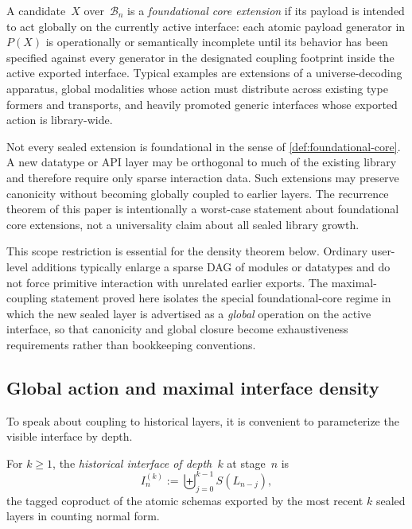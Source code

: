 \documentclass{lmcs}
\newcommand{\B}{\mathcal{B}}
\begin{document}
\begin{defi}
\label{def:foundational-core}
A candidate~$X$ over~$\B_n$ is a \emph{foundational core extension} if its payload is intended to act globally on the currently active interface: each atomic payload generator in $P(X)$ is operationally or semantically incomplete until its behavior has been specified against every generator in the designated coupling footprint inside the active exported interface. Typical examples are extensions of a universe-decoding apparatus, global modalities whose action must distribute across existing type formers and transports, and heavily promoted generic interfaces whose exported action is library-wide.
\end{defi}

\begin{rem}
\label{rem:orthogonal}
Not every sealed extension is foundational in the sense of \autoref{def:foundational-core}. A new datatype or API layer may be orthogonal to much of the existing library and therefore require only sparse interaction data. Such extensions may preserve canonicity without becoming globally coupled to earlier layers. The recurrence theorem of this paper is intentionally a worst-case statement about foundational core extensions, not a universality claim about all sealed library growth.
\end{rem}

This scope restriction is essential for the density theorem below. Ordinary user-level additions typically enlarge a sparse DAG of modules or datatypes and do not force primitive interaction with unrelated earlier exports. The maximal-coupling statement proved here isolates the special foundational-core regime in which the new sealed layer is advertised as a \emph{global} operation on the active interface, so that canonicity and global closure become exhaustiveness requirements rather than bookkeeping conventions.

\subsection{Global action and maximal interface density}

To speak about coupling to historical layers, it is convenient to parameterize the visible interface by depth.

\begin{defi}
\label{def:historical-interface}
For $k \geq 1$, the \emph{historical interface of depth~$k$} at stage~$n$ is
\[
  I_n^{(k)} := \biguplus_{j=0}^{k-1} S(L_{n-j}),
\]
the tagged coproduct of the atomic schemas exported by the most recent $k$ sealed layers in counting normal form.
\end{defi}
\end{document}
